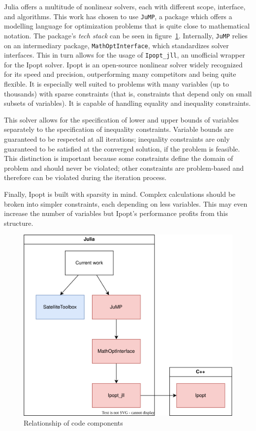 Julia offers a multitude of nonlinear solvers, each with different scope, interface, and algorithms. This work has chosen to use \texttt{JuMP}, a package which offers a modelling language for optimization problems that is quite close to mathematical notation. The package's \textit{tech stack} can be seen in figure~\ref{fig:tech_stack}. Internally, \texttt{JuMP} relies on an intermediary package, \texttt{MathOptInterface}, which standardizes solver interfaces. This in turn allows for the usage of \texttt{Ipopt\_jll}, an unofficial wrapper for the Ipopt solver. Ipopt is an open-source nonlinear solver widely recognized for its speed and precision, outperforming many competitors and being quite flexible. It is especially well suited to problems with many variables (up to thousands) with sparse constraints (that is, constraints that depend only on small subsets of variables). It is capable of handling equality and inequality constraints.

This solver allows for the specification of lower and upper bounds of variables separately to the specification of inequality constraints. Variable bounds are guaranteed to be respected at all iterations; inequality constraints are only guaranteed to be satisfied at the converged solution, if the problem is feasible. This distinction is important because some constraints define the domain of problem and should never be violated; other constraints are problem-based and therefore can be violated during the iteration process.

Finally, Ipopt is built with sparsity in mind. Complex calculations should be broken into simpler constraints, each depending on less variables. This may even increase the number of variables but Ipopt's performance profits from this structure.

\begin{figure}[htbp]
    \centering
        \includegraphics[width=\textwidth]{img/techstack.png}
    \caption{Relationship of code components}
    \label{fig:tech_stack}
\end{figure}

